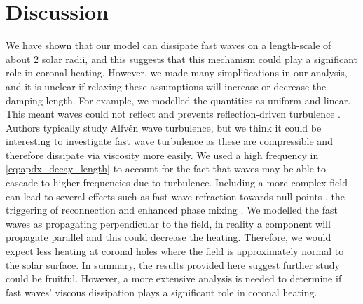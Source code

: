 \section{Discussion}

We have shown that our model can dissipate fast waves on a length-scale of about 2 solar radii, and this suggests that this mechanism could play a significant role in coronal heating. However, we made many simplifications in our analysis, and it is unclear if relaxing these assumptions will increase or decrease the damping length. For example, we modelled the quantities as uniform and linear. This meant waves could not reflect and prevents reflection-driven turbulence \citep{Hollweg1986a,vanBallegooijen2011,Shoda2019}. Authors typically study Alfv\'en wave turbulence, but we think it could be interesting to investigate fast wave turbulence as these are compressible and therefore dissipate via viscosity more easily. We used a high frequency in \eqref{eq:apdx_decay_length} to account for the fact that waves may be able to cascade to higher frequencies due to turbulence. Including a more complex field can lead to several effects such as fast wave refraction towards null points \citep{McLaughlin2006,McLaughlin2011,McLaughlin2016}, the triggering of reconnection \citep{McLaughlin2009} and enhanced phase mixing \citep{Similon1989,Howson2020a}. We modelled the fast waves as propagating perpendicular to the field, in reality a component will propagate parallel and this could decrease the heating. Therefore, we would expect less heating at coronal holes where the field is approximately normal to the solar surface. In summary, the results provided here suggest further study could be fruitful. However, a more extensive analysis is needed to determine if fast waves' viscous dissipation plays a significant role in coronal heating.